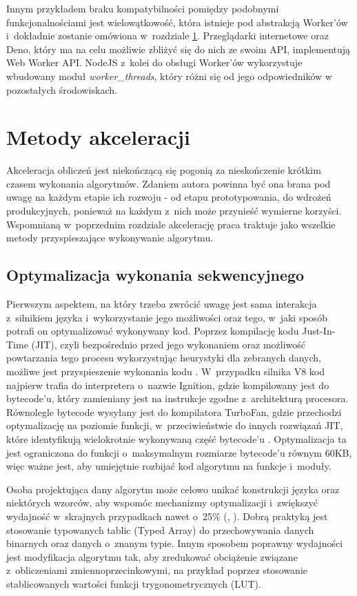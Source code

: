 Innym przykładem braku kompatybilności pomiędzy podobnymi funkcjonalnościami jest wielowątkowość, która istnieje pod abstrakcją Worker'ów i~dokładnie zostanie omówiona w~rozdziale \ref{sec:acc-methods}. Przeglądarki internetowe oraz Deno, który ma na celu możliwie zbliżyć się do nich ze swoim API, implementują Web Worker API. NodeJS z~kolei do obsługi Worker'ów wykorzystuje wbudowany moduł \textit{worker\_threads}, który różni się od jego odpowiedników w pozostałych środowiskach.    

\section{Metody akceleracji}
\label{sec:acc-methods}

Akceleracja obliczeń jest niekończącą się pogonią za nieskończenie krótkim czasem wykonania algorytmów. Zdaniem autora powinna być ona brana pod uwagę na każdym etapie ich rozwoju - od etapu prototypowania, do wdrożeń produkcyjnych, ponieważ na każdym z~nich może przynieść wymierne korzyści. Wspomnianą w~poprzednim rozdziale akcelerację praca traktuje jako wszelkie metody przyspieszające wykonywanie algorytmu.

\subsection{Optymalizacja wykonania sekwencyjnego}

Pierwszym aspektem, na który trzeba zwrócić uwagę jest sama interakcja z~silnikiem języka i~wykorzystanie jego możliwości oraz tego, w~jaki sposób potrafi on optymalizować wykonywany kod. Poprzez kompilację kodu Just-In-Time (JIT), czyli bezpośrednio przed jego wykonaniem oraz możliwość powtarzania tego procesu wykorzystując heurystyki dla zebranych danych, możliwe jest przyspieszenie wykonania kodu \cite{meurer_2017}. W~przypadku silnika V8 kod najpierw trafia do interpretera o~nazwie Ignition, gdzie kompilowany jest do bytecode'u, który zamieniany jest na instrukcje zgodne z~architekturą procesora. Równolegle bytecode wysyłany jest do kompilatora TurboFan, gdzie przechodzi optymalizację na poziomie funkcji, w~przeciwieństwie do innych rozwiązań JIT, które identyfikują wielokrotnie wykonywaną część bytecode'u \cite{meurer_2019}. Optymalizacja ta jest ograniczona do funkcji o~maksymalnym rozmiarze bytecode'u równym 60KB, więc ważne jest, aby umiejętnie rozbijać kod algorytmu na funkcje i~moduły.

Osoba projektująca dany algorytm może celowo unikać konstrukcji języka oraz niektórych wzorców, aby wspomóc mechanizmy optymalizacji i~zwiększyć wydajność w~skrajnych przypadkach nawet o~25\% (\cite{gong2015jitprof}, \cite{selakovic2016performance}). Dobrą praktyką jest stosowanie typowanych tablic (Typed Array) do przechowywania danych binarnych oraz danych o~znanym typie. Innym sposobem poprawny wydajności jest modyfikacja algorytmu tak, aby zredukować obciążenie związane z~obliczeniami zmiennoprzecinkowymi, na przykład poprzez stosowanie stablicowanych wartości funkcji trygonometrycznych (LUT).

